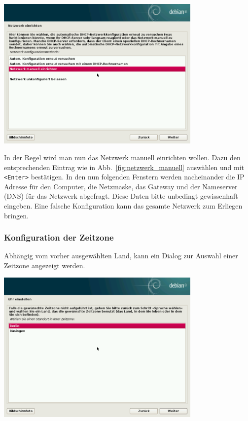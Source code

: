 \documentclass[a4paper,12pt,twoside]{article}
\begin{document}
\begin{minipage}{\textwidth}
    \centering
    \captionsetup{type=figure}
    \includegraphics[width=10cm]{screenshots/select_network_manually.png}
    \label{fig:netzwerk_manuell}
\end{minipage}
\bigskip

In der Regel wird man nun das Netzwerk manuell einrichten wollen. Dazu
den entsprechenden Eintrag wie in Abb.~\ref{fig:netzwerk_manuell} auswählen und
mit \texttt{{\textless}Enter{\textgreater}} bestätigen. In den nun folgenden
Fenstern werden nacheinander die IP Adresse für den Computer, die
Netzmaske, das Gateway und der Nameserver (DNS) für das Netzwerk
abgefragt. Diese Daten bitte unbedingt gewissenhaft eingeben. Eine
falsche Konfiguration kann das gesamte Netzwerk zum Erliegen bringen.


\subsubsection{Konfiguration der Zeitzone}
\label{sct:inst_timezone}

Abhängig vom vorher ausgewählten Land, kann ein Dialog zur Auswahl einer
Zeitzone angezeigt werden.

\bigskip
\begin{minipage}{\linewidth}
    \centering
    \captionsetup{type=figure}
    \includegraphics[width=10cm]{screenshots/select_timezone.png}
    \label{fig:inst_timezone}
\end{minipage}
\end{document}
